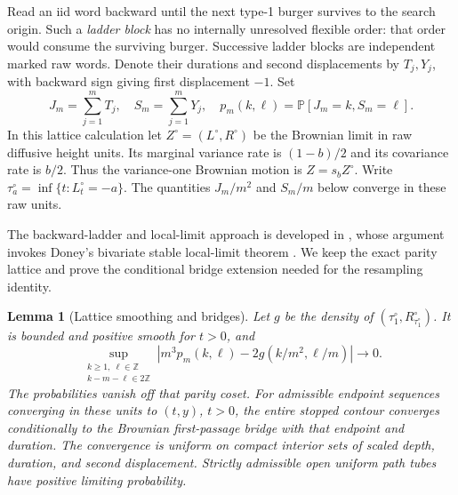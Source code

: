 \documentclass[11pt]{article}
\numberwithin{equation}{section}
\newtheorem{lemma}[theorem]{Lemma}
\theoremstyle{definition}
\theoremstyle{remark}
\newcommand{\Z}{\mathbb Z}
\newcommand{\PP}{\mathbb P}
\newcommand{\1}{\mathbf 1}
\begin{document}
Read an iid word backward until the next type-1 burger survives to the
search origin.  Such a \emph{ladder block} has no internally unresolved
flexible order: that order would consume the surviving burger.
Successive ladder blocks are independent marked raw words.  Denote
their durations and second displacements by \(T_j,Y_j\), with backward
sign giving first displacement \(-1\).  Set
\[
 J_m=\sum_{j=1}^mT_j,\quad S_m=\sum_{j=1}^mY_j,\quad
 p_m(k,\ell)=\PP[J_m=k,S_m=\ell].
\]
In this lattice calculation let \(Z^\circ=(L^\circ,R^\circ)\)
be the Brownian limit in raw diffusive height units.  Its marginal
variance rate is \((1-b)/2\) and its covariance rate is \(b/2\).
Thus the variance-one Brownian motion is \(Z=s_bZ^\circ\).
Write \(\tau_a^\circ=\inf\{t:L_t^\circ=-a\}\).  The quantities
\(J_m/m^2\) and \(S_m/m\) below converge in these raw units.

The backward-ladder and local-limit approach is developed in
\citet[Section~2.1, Lemma~2.1, Proposition~2.2 and Lemma~2.3]{GwynneSunFKII},
whose argument invokes Doney's bivariate stable local-limit theorem \citep{DoneyBivariate}. We keep the
exact parity lattice and prove the conditional bridge extension needed
for the resampling identity.

\begin{lemma}[Lattice smoothing and bridges]\label{ker:ladder}
Let \(g\) be the density of \((\tau_1^\circ,R^\circ_{\tau_1^\circ})\).  It is bounded
and positive smooth for \(t>0\), and
\begin{equation}
 \sup_{\substack{k\ge1,\ \ell\in\Z\\k-m-\ell\in2\Z}}
 \left|m^3p_m(k,\ell)-2g(k/m^2,\ell/m)\right|\longrightarrow0.
 \label{ker:llt}
\end{equation}
The probabilities vanish off that parity coset.
For admissible endpoint sequences converging in these units to
\((t,y)\), \(t>0\), the entire stopped contour converges conditionally
to the Brownian first-passage bridge with that endpoint and duration.
The convergence is uniform on compact interior sets of scaled depth,
duration, and second displacement.  Strictly admissible open uniform
path tubes have positive limiting probability.
\end{lemma}
\end{document}
